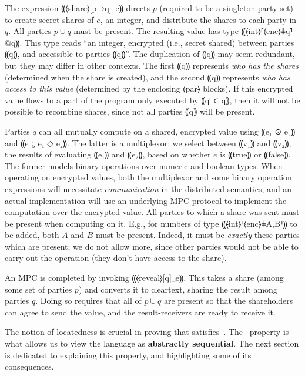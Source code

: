 The \mpc expression ⸨⦑share⦒[p→q]␣e⸩ directs $p$ (required to be a singleton party set) to
create secret shares of $e$, an integer, and distribute the shares to
each party in
$q$. All parties $p \cup q$ must be present. The resulting value
has type ⸨⦑int⦒⸢⦑enc⦒⋕q⸣@q⸩. This type reads “an integer, encrypted
(i.e., secret shared) between parties ⸨q⸩, and accessible to parties
⸨q⸩”. The duplication of ⸨q⸩ may seem redundant, but they may differ
in other contexts. The first ⸨q⸩ represents \emph{who has the
shares} (determined when the share is created), and the second ⸨q⸩
represents \emph{who has access to this value} (determined by the
enclosing ⦑par⦒ blocks). If this encrypted value flows to a part of
the program only executed by ⸨q′ ⊂ q⸩, then it will not be possible to
recombine shares, since not all parties ⸨q⸩ will be present.

Parties $q$ can all mutually compute on a shared, encrypted value
using ⸨e₁ ⊙ e₂⸩ and ⸨e ¿ e₁ ◇ e₂⸩. The latter is a
multiplexor: we select between ⸨v₁⸩ and ⸨v₂⸩, the results of evaluating ⸨e₁⸩ and ⸨e₂⸩,
based on whether $e$ is ⸨true⸩ or ⸨false⸩. The former models binary operations over numeric and boolean types.
When operating on encrypted values, both the multiplexor and some binary
operation expressions will necessitate \emph{communication} in the
distributed semantics, and an actual implementation will use an
underlying MPC protocol to implement the computation over the encrypted value.
All parties to which a share was sent must be present when computing on it. E.g., for numbers of type
⸨⦑int⦒⸢⦑enc⦒⋕{A,B}⸣⸩ to be added, both $A$ and $B$ must be
present. Indeed, it must be \emph{exactly} these parties which are
present; we do not allow more, since other parties would not be
able to carry out the operation (they don't have access to the
share).

An MPC is completed by invoking ⸨⦑reveal⦒[q]␣e⸩. This takes a share
(among some set of parties $p$) and converts it to cleartext,
sharing the result among parties $q$. Doing so requires that all of
$p \cup q$ are present so that the shareholders
can agree to send the value, and the result-receivers are ready to
receive it.

The notion of locatedness is crucial in proving that \mpc{} satisfies~.
The~ property is what allows us to view the language as \textbf{abstractly sequential}. The
next section is dedicated to explaining this property, and highlighting some of its consequences.

